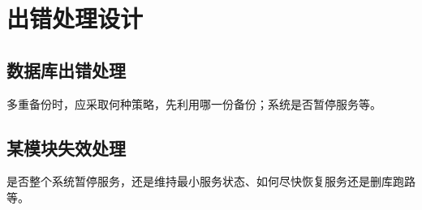 \chapter{出错处理设计}
\section{数据库出错处理}
多重备份时，应采取何种策略，先利用哪一份备份；系统是否暂停服务等。

\section{某模块失效处理}
是否整个系统暂停服务，还是维持最小服务状态、如何尽快恢复服务还是删库跑路等。